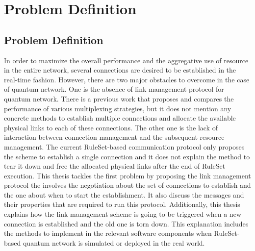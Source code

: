 \chapter{Problem Definition}
\label{problem-definition}

\section{Problem Definition}

In order to maximize the overall performance and the aggregative use of resource in the entire network, several connections are desired to be established in the real-time fashion.
However, there are two major obstacles to overcome in the case of quantum network. 
One is the absence of link management protocol for quantum network. There is a previous work \cite{aparicio2011multiplexing} that proposes and compares the performance of various multiplexing strategies, but it does not mention any concrete methods to establish multiple connections and allocate the available physical links to each of these connections.
The other one is the lack of interaction between connection management and the subsequent resource management. The current RuleSet-based communication protocol \cite{matsuo2019quantum} only proposes the scheme to establish a single connection and it does not explain the method to tear it down and free the allocated physical links after the end of RuleSet execution. 
This thesis tackles the first problem by proposing the link management protocol the involves the negotiation about the set of connections to establish and the one about when to start the establishment. It also discuss the messages and their properties that are required to run this protocol.
Additionally, this thesis explains how the link management scheme is going to be triggered when a new connection is established and the old one is torn down. This explanation includes the methods to implement in the relevant software components when RuleSet-based quantum network is simulated or deployed in the real world.
